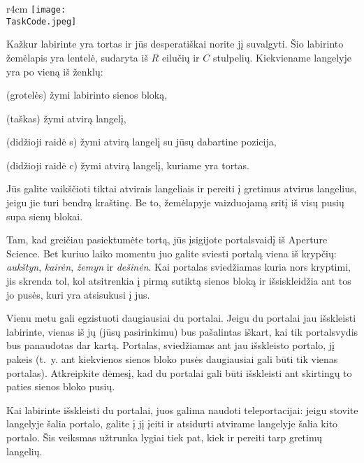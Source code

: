 \documentclass{boi2014-lt}
\renewcommand{\TaskCode}{portals}
\newcommand{\constant}[1]{{\tt #1}}
\begin{document}
    \begin{wrapfigure}[3]{r}{4cm}
        \vspace{-24pt}
        \texttt{[image: \\TaskCode.jpeg]}
    \end{wrapfigure}

    Kažkur labirinte yra tortas ir jūs desperatiškai norite jį suvalgyti.
    Šio labirinto žemėlapis yra lentelė, sudaryta iš $R$ eilučių ir $C$
    stulpelių. Kiekviename langelyje yra po vieną iš ženklų:
    \begin{description}[itemindent=1pt]
    	\item[\constant{\#}] (grotelės) žymi labirinto sienos bloką,
        \item[\constant{.}] (taškas) žymi atvirą langelį,
        \item[\constant{S}] (didžioji raidė s) žymi atvirą langelį su jūsų
            dabartine pozicija,
        \item[\constant{C}] (didžioji raidė c) žymi atvirą langelį, kuriame yra
            tortas.
    \end{description}

    Jūs galite vaikščioti tiktai atvirais langeliais ir pereiti į gretimus
    atvirus langelius, jeigu jie turi bendrą kraštinę. Be to, žemėlapyje
    vaizduojamą sritį iš visų pusių supa sienų blokai.

    Tam, kad greičiau pasiektumėte tortą, jūs įsigijote portalsvaidį iš
    Aperture Science\texttrademark{}. Bet kuriuo laiko momentu juo galite sviesti
    portalą viena iš krypčių: \emph{aukštyn}, \emph{kairėn}, \emph{žemyn} ir
    \emph{dešinėn}. Kai portalas sviedžiamas kuria nors kryptimi, jis skrenda
    tol, kol atsitrenkia į pirmą sutiktą sienos bloką ir išsiskleidžia ant tos jo
    pusės, kuri yra atsisukusi į jus.

    Vienu metu gali egzistuoti daugiausiai du portalai. Jeigu du portalai jau
    išskleisti labirinte, vienas iš jų (jūsų pasirinkimu) bus pašalintas iškart,
    kai tik portalsvydis bus panaudotas dar kartą. Portalas, sviedžiamas ant
    jau išskleisto portalo, jį pakeis (t.~y. ant kiekvienos sienos bloko pusės
    daugiausiai gali būti tik vienas portalas).
    Atkreipkite dėmesį, kad du portalai gali būti išskleisti ant skirtingų to
    paties sienos bloko pusių.

    Kai labirinte išskleisti du portalai, juos galima naudoti teleportacijai:
    jeigu stovite langelyje šalia portalo, galite į jį įeiti ir atsidurti
    atvirame langelyje šalia kito portalo. Šis veiksmas užtrunka lygiai tiek pat,
    kiek ir pereiti tarp gretimų langelių.
\end{document}
